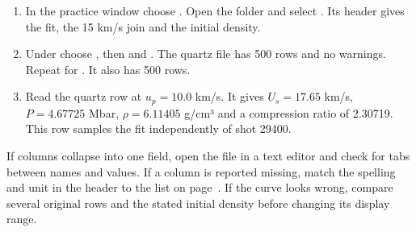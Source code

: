 \begin{enumerate}
\item In the practice window choose . Open the  folder and select . Its header gives the fit, the 15 km/s join and the initial density.
\item Under  choose , then  and . The quartz file has 500 rows and no warnings. Repeat for . It also has 500 rows.
\item Read the quartz row at $u_p=10.0$ km/s. It gives $U_s=17.65$ km/s, $P=4.67725$ Mbar, $\rho=6.11405$ g/cm³ and a compression ratio of 2.30719. This row samples the fit independently of shot 29400.
\end{enumerate}
If columns collapse into one field, open the file in a text editor and check for tabs between names and values. If a column is reported missing, match the spelling and unit in the header to the list on page~\pageref{materials}. If the curve looks wrong, compare several original rows and the stated initial density before changing its display range.
